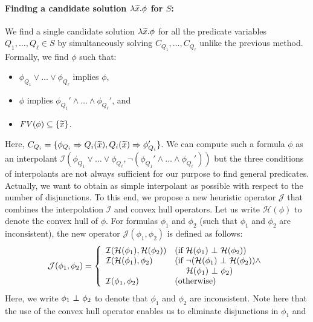 \paragraph{Finding a candidate solution \(\lambda \widetilde{x}.\phi\) for \(S\):}
We find a single candidate solution \(\lambda \widetilde{x}.\phi\) for all the 
predicate variables \(Q_1,\dots,Q_{\ell} \in S\) by simultaneously 
solving \(C_{Q_1},\dots,C_{Q_{\ell}}\) unlike the previous method.  
Formally, we find \(\phi\) such that:
\begin{itemize}
\item \(\phi_{Q_1} \lor \dots \lor \phi_{Q_{\ell}}\) implies \(\phi\),
\item \(\phi\) implies \(\phi_{Q_1}' \land \dots \land \phi_{Q_{\ell}}'\), and
\item \(\mathit{FV}({\phi}) \subseteq \{{\widetilde{x}}\}\).
\end{itemize}
Here, \(C_{Q_i}=\{{\phi_{Q_i} \Rightarrow Q_i(\widetilde{x}),Q_i(\widetilde{x}) \Rightarrow 
\phi_{Q_i}'}\}\).  We can compute such a formula \(\phi\) as an 
interpolant \(\mathcal{I}(\phi_{Q_1} \lor \dots \lor 
\phi_{Q_{\ell}},\neg (\phi_{Q_1}' \land \dots \land \phi_{Q_{\ell}}'))\) 
but the three conditions of interpolants are not always sufficient for 
our purpose to find general predicates.  Actually, we want to obtain as 
simple interpolant as possible with respect to the number of 
disjunctions.
To this end, we propose a new heuristic operator \(\mathcal{J}\) that 
combines the interpolation \(\mathcal{I}\) and convex hull operators.  
Let us write \(\mathcal{H}(\phi)\) to denote the convex hull of \(\phi\). 
 For formulas \(\phi_1\) and \(\phi_2\) (such that \(\phi_1\) and 
\(\phi_2\) are inconsistent), the new operator 
\(\mathcal{J}(\phi_1,\phi_2)\) is defined as follows:
\[
\mathcal{J}(\phi_1,\phi_2) =
\left\{
\begin{array}{ll}
\mathcal{I}(\mathcal{H}(\phi_1),\mathcal{H}(\phi_2)) & (\mbox{if~}\mathcal{H}(\phi_1) \ \bot\  \mathcal{H}(\phi_2)) \\
\mathcal{I}(\mathcal{H}(\phi_1),\phi_2) & (\mbox{if~}\neg (\mathcal{H}(\phi_1) \ \bot\  \mathcal{H}(\phi_2)) \land \\
&\ \quad \mathcal{H}(\phi_1) \ \bot\  \phi_2) \\
\mathcal{I}(\phi_1,\phi_2) & (\mbox{otherwise})
\end{array}
\right.
\]
Here, we write \(\phi_1 \ \bot\  \phi_2\) to denote that \(\phi_1\) and 
\(\phi_2\) are inconsistent.  Note here that the use of the convex hull 
operator enables us to eliminate disjunctions in \(\phi_1\) and 
